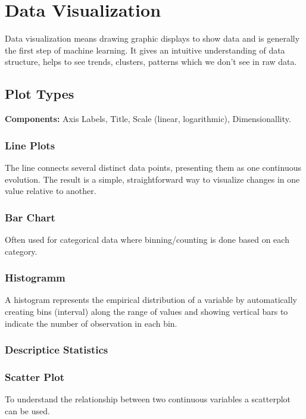 \section{Data Visualization}
Data visualization means drawing graphic displays to show data and is generally the first step of machine learning. It gives an  intuitive understanding of data structure,  helps to see trends, clusters, patterns which we don't see in raw data.

\subsection{Plot Types}
\textbf{Components:} Axis Labels, Title, Scale (linear, logarithmic), Dimensionallity.

\subsubsection{Line Plots}
The line connects several distinct data points, presenting them as one continuous evolution. The result is a simple, straightforward way to visualize changes in one value relative to another.

\subsubsection{Bar Chart}
Often used for categorical data where binning/counting  is done based on each category. 

\subsubsection{Histogramm}
A histogram represents the empirical distribution of a variable by automatically creating bins (interval) along the range of values and showing vertical bars to indicate the number of observation in each bin.

\subsubsection{Descriptice Statistics}

\subsubsection{Scatter Plot}
To understand the relationship between two continuous variables a scatterplot can be used. 